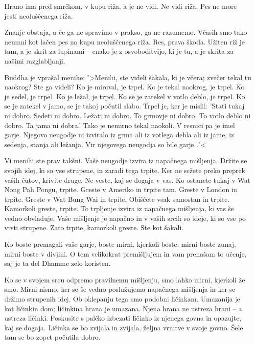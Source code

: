Hrano ima pred smrčkom, v kupu riža, a je ne vidi. Ne vidi riža. Pes ne more jesti neoluščenega riža.

Znanje obstaja, a če ga ne spravimo v prakso, ga ne razumemo. Včasih smo tako neumni kot lačen pes na kupu neoluščenega riža. Res, prava škoda. Užiten riž je tam, a je skrit za lupinami – enako je z osvoboditvijo, ki je tu, a je skrita za našimi razglabljanji.

\clearpage


Buddha je vprašal menihe: ">Menihi, ste videli šakala, ki je včeraj zvečer tekal tu naokrog? Ste ga videli? Ko je miroval, je trpel. Ko je tekal naokrog, je trpel. Ko je sedel, je trpel. Ko je ležal, je trpel. Ko se je zatekel v votlo deblo, je trpel. Ko se je zatekel v jamo, se je takoj počutil slabo. Trpel je, ker je mislil: 'Stati tukaj ni dobro. Sedeti ni dobro. Ležati ni dobro. To grmovje ni dobro. To votlo deblo ni dobro. Ta jama ni dobra.' Tako je nemirno tekal naokoli. V resnici pa je imel garje. Njegovo neugodje ni izviralo iz grma ali iz votlega debla ali iz jame, iz sedenja, stanja ali ležanja. Vir njegovega neugodja so bile garje ."<

Vi menihi ste prav takšni. Vaše neugodje izvira iz napačnega mišljenja. Držite se svojih idej, ki so vse strupene, in zaradi tega trpite. Ker ne sežete preko preprek vaših čutov, krivite druge. Ne veste, kaj se dogaja v vas. Ko ostanete tukaj v Wat Nong Pah Pongu, trpite. Greste v Ameriko in trpite tam. Greste v London in trpite. Greste v Wat Bung Wai in trpite. Obiščete vsak samostan in trpite. Kamorkoli greste, trpite. To trpljenje izvira iz napačnega mišljenja, ki vas še vedno obvladuje. Vaše mišljenje je napačno in v vaših srcih so ideje, ki so vse po vrsti strupene. Zato trpite, kamorkoli greste. Ste kot šakali.

Ko boste premagali vaše garje, boste mirni, kjerkoli boste: mirni boste zunaj, mirni boste v divjini. O tem velikokrat premišljujem in vam prenašam to učenje, saj je ta del Dhamme zelo koristen.

\enlargethispage{\baselineskip}

\clearpage


Ko se v svojem srcu odpremo pravilnemu mišljenju, smo lahko mirni, kjerkoli že smo. Mirni nismo, ker se še vedno poslužujemo napačnega mišljenja in ker se držimo strupenih idej. Ob oklepanju tega smo podobni ličinkam. Umazanija je kot ličinkin dom; ličinkina hrana je umazana. Njena hrana ne ustreza hrani – a ustreza ličinki. Poskusite s palčko izbezati ličinko iz njenega govna in opazujte, kaj se dogaja. Ličinka se bo zvijala in zvijala, željna vrnitve v svoje govno. Šele tam se bo zopet počutila dobro.

